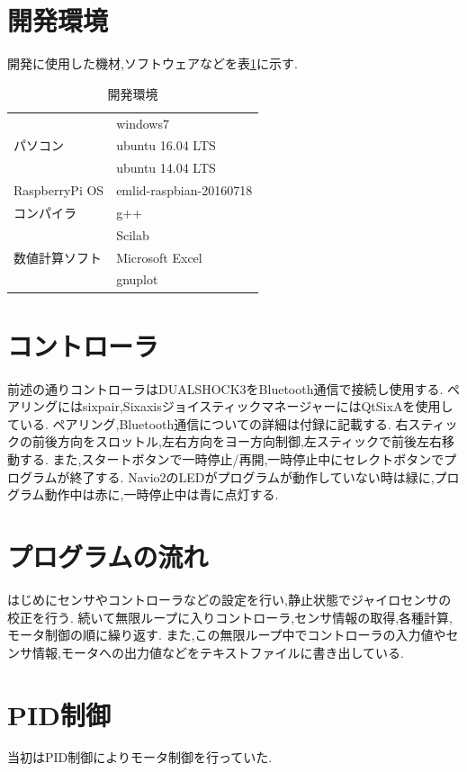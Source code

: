 \documentclass[12pt,oneside]{sotsuken_paper}
\begin{document}
\section{開発環境}
開発に使用した機材,ソフトウェアなどを表\ref{table:dev}に示す.

\begin{table}[htbp]
	\begin{center}
		\caption{開発環境}
		\begin{tabular}{|l|l|} \hline
			 & windows7 \\
			パソコン & ubuntu 16.04 LTS \\
			 & ubuntu 14.04 LTS \\ \hline
			RaspberryPi OS & emlid-raspbian-20160718 \\ \hline
			コンパイラ & g++ \\ \hline
			 & Scilab \\
			数値計算ソフト & Microsoft Excel \\
			 & gnuplot \\ \hline
		\end{tabular}
		\label{table:dev}
	\end{center}
\end{table}

\section{コントローラ}
前述の通りコントローラはDUALSHOCK3をBluetooth通信で接続し使用する.
ペアリングにはsixpair,SixaxisジョイスティックマネージャーにはQtSixAを使用している.
ペアリング,Bluetooth通信についての詳細は付録に記載する.
右スティックの前後方向をスロットル,左右方向をヨー方向制御,左スティックで前後左右移動する.
また,スタートボタンで一時停止/再開,一時停止中にセレクトボタンでプログラムが終了する.
Navio2のLEDがプログラムが動作していない時は緑に,プログラム動作中は赤に,一時停止中は青に点灯する.

\section{プログラムの流れ}
はじめにセンサやコントローラなどの設定を行い,静止状態でジャイロセンサの校正を行う.
続いて無限ループに入りコントローラ,センサ情報の取得,各種計算,モータ制御の順に繰り返す.
また,この無限ループ中でコントローラの入力値やセンサ情報,モータへの出力値などをテキストファイルに書き出している.

\section{PID制御}
当初はPID制御によりモータ制御を行っていた.
\end{document}
